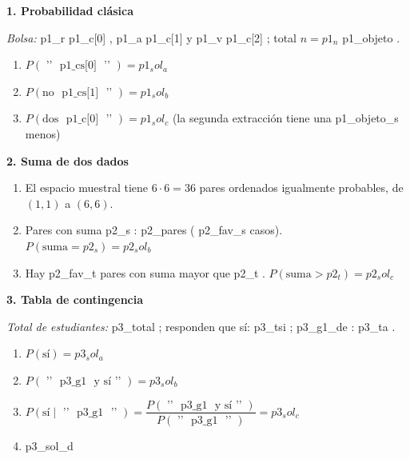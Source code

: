 \documentclass[10pt]{article}
\begin{document}
{{{%

\vspace{0.3cm}

\textbf{1. Probabilidad clásica} \par
\textit{Bolsa:} {{ p1_r }} {{ p1_c[0] }}, {{ p1_a }} {{ p1_c[1] }} y {{ p1_v }} {{ p1_c[2] }}; total $n = {{ p1_n }}$ {{ p1_objeto }}.
\begin{enumerate}[leftmargin=1.4em, itemsep=6pt, topsep=4pt, parsep=0pt]
\item[a)] $P(\text{{ '{' }}{{ p1_cs[0] }}{{ '}' }}) = {{ p1_sol_a }}$
\item[b)] $P(\text{no {{ p1_cs[1] }}{{ '}' }}) = {{ p1_sol_b }}$
\item[c)] $P(\text{dos {{ p1_c[0] }}{{ '}' }}) = {{ p1_sol_c }}$ \quad (la segunda extracción tiene una {{ p1_objeto_s }} menos)
\end{enumerate}

\vspace{0.3cm}

\textbf{2. Suma de dos dados} \par
\begin{enumerate}[leftmargin=1.4em, itemsep=6pt, topsep=4pt, parsep=0pt]
\item[a)] El espacio muestral tiene $6 \cdot 6 = 36$ pares ordenados igualmente probables, de $(1,1)$ a $(6,6)$.
\item[b)] Pares con suma {{ p2_s }}: {{ p2_pares }} ({{ p2_fav_s }} casos). \quad $P(\text{suma} = {{ p2_s }}) = {{ p2_sol_b }}$
\item[c)] Hay {{ p2_fav_t }} pares con suma mayor que {{ p2_t }}. \quad $P(\text{suma} > {{ p2_t }}) = {{ p2_sol_c }}$
\end{enumerate}

\vspace{0.3cm}

\textbf{3. Tabla de contingencia} \par
\textit{Total de estudiantes:} {{ p3_total }}; responden que sí: {{ p3_tsi }}; {{ p3_g1_de }}: {{ p3_ta }}.
\begin{enumerate}[leftmargin=1.4em, itemsep=6pt, topsep=4pt, parsep=0pt]
\item[a)] $P(\text{sí}) = {{ p3_sol_a }}$
\item[b)] $P(\text{{ '{' }}{{ p3_g1 }} y sí{{ '}' }}) = {{ p3_sol_b }}$
\item[c)] $P(\text{sí} \mid \text{{ '{' }}{{ p3_g1 }}{{ '}' }}) = \dfrac{P(\text{{ '{' }}{{ p3_g1 }} y sí{{ '}' }})}{P(\text{{ '{' }}{{ p3_g1 }}{{ '}' }})} = {{ p3_sol_c }}$
\item[d)] {{ p3_sol_d }}
\end{enumerate}

}}}
\end{document}
